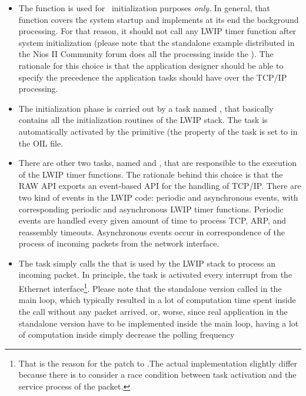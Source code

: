 \begin{itemize}
\item The  function is used for \ee\ initialization
  purposes {\em only}. In general, that function covers the system
  startup and implements at its end the background processing. For
  that reason, it should not call any LWIP timer function after system
  initialization (please note that the standalone example distributed
  in the Nios II Community forum does all the processing inside the
  ). The rationale for this choice is that the application
  designer should be able to specify the precedence the application
  tasks should have over the TCP/IP processing.
\item The initialization phase is carried out by a task named
  , that basically contains all the
  initialization routines of the LWIP stack. The task is automatically
  activated by the  primitive (the 
  property of the task is set to  in the OIL file.
\item There are other two tasks, named  and
  , that are responsible to the execution of the
  LWIP timer functions. The rationale behind this choice is that the
  RAW API exports an event-based API for the handling of TCP/IP. There
  are two kind of events in the LWIP code: periodic and asynchronous
  events, with corresponding periodic and asynchronous LWIP timer
  functions. Periodic events are handled every given amount of time to
  process TCP, ARP, and reassembly timeouts. Asynchronous events occur
  in correspondence of the process of incoming packets from the
  network interface.
\item The  task simply calls the
   that is used by the LWIP stack to process
  an incoming packet. In principle, the  task is
  activated every interrupt from the Ethernet interface\footnote{That
  is the reason for the patch to .The
  actual implementation slightly differ because there is to consider a
  race condition between task activation and the service process of
  the packet.}. Please note that the standalone version called
   in the main loop, which typically resulted
  in a lot of computation time spent inside the call without any
  packet arrived, or, worse, since real application in the standalone
  version have to be implemented inside the main loop, having a lot of
  computation inside  simply decrease the polling frequency

\end{itemize}
